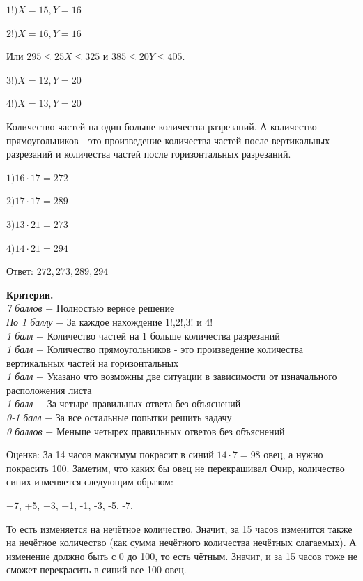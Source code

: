 $1!) X=15, Y=16$

$2!) X=16, Y=16$

Или $295	\leqslant 25X 	\leqslant 325$ и $385	\leqslant 20Y 	\leqslant 405$.

$3!) X=12, Y=20$

$4!) X=13, Y=20$

Количество частей на один больше количества разрезаний. А количество прямоугольников - это произведение количества частей после вертикальных разрезаний и количества частей после горизонтальных разрезаний.

$1) 16\cdot17=272$

$2) 17\cdot17=289$

$3) 13\cdot21=273$

$4) 14\cdot21=294$

Ответ: $272, 273, 289, 294$

\textbf{Критерии.} \\
\textit{7 баллов} $-$ Полностью верное решение\\
\textit{По 1 баллу} $-$ За каждое нахождение 1!,2!,3! и 4! \\ 
\textit{1 балл} $-$ Количество частей на 1 больше количества разрезаний\\
\textit{1 балл} $-$ Количество прямоугольников - это произведение количества вертикальных частей на горизонтальных\\
\textit{1 балл} $-$ Указано что возможны две ситуации в зависимости от изначального расположения листа\\
\textit{1 балл} $-$  За четыре правильных ответа без объяснений\\ 
\textit{0-1 балл} $-$ За все остальные попытки решить задачу\\
\textit{0 баллов} $-$ Меньше четырех правильных ответов без объяснений\\
\par

\centerline{\bf }
\centerline{\bf }
\centerline{\bf }
\centerline{\bf }
\centerline{\bf }
\centerline{\bf }
\centerline{\bf }
\centerline{\bf }

 Оценка: За 14 часов максимум покрасит в синий $14\cdot7=98$ овец, а нужно покрасить 100. Заметим, что каких бы овец не перекрашивал Очир, количество синих изменяется следующим образом:

+7, +5, +3, +1, -1, -3, -5, -7. 

То есть изменяется на нечётное количество. Значит, за 15 часов изменится также на нечётное количество (как сумма нечётного количества нечётных слагаемых). А изменение должно быть с 0 до 100, то есть чётным. Значит, и за 15 часов тоже не сможет перекрасить в синий все 100 овец. 

